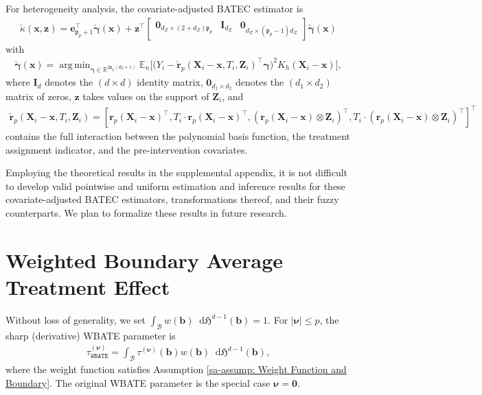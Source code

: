 \documentclass[10pt]{article}
\DeclareMathOperator*{\argmin}{arg\,min}
\newcommand{\En}{\mathbb{E}_n}
\newcommand{\Haus}{\mathfrak{H}}
\newcommand{\dif}{\mathop{}\!\mathrm{d}}
\newcommand{\bb}{\mathbf{b}}
\newcommand{\be}{\mathbf{e}}
\newcommand{\br}{\mathbf{r}}
\newcommand{\bx}{\mathbf{x}}
\newcommand{\bX}{\mathbf{X}}
\newcommand{\bz}{\mathbf{z}}
\newcommand{\bZ}{\mathbf{Z}}
\newcommand{\bnu}{\boldsymbol{\nu}}
\newcommand{\bgamma}{\boldsymbol{\gamma}}
\newcommand{\B}{\mathcal{B}}
\begin{document}
For heterogeneity analysis, the covariate-adjusted BATEC estimator is
\begin{align*}
    \check{\kappa}(\bx,\bz)
    = \be_{\mathfrak{p}_p+1}^{\top}\check{\bgamma}(\bx)
    + \bz^\top
      \begin{bmatrix}
        \mathbf{0}_{d_Z \times (2+d_Z)\mathfrak{p}_p}
        & \mathbf{I}_{d_Z} & \mathbf{0}_{d_Z \times (\mathfrak{p}_p-1)d_Z}
      \end{bmatrix}
      \check{\bgamma}(\bx)
\end{align*}
with
\begin{align*}
    \check{\bgamma}(\bx)
    = \argmin_{\bgamma \in \mathbb{R}^{2\mathfrak{p}_p(d_Z+1)}}
      \En \big[ \big(Y_i - \check{\br}_p(\bX_i-\bx,T_i,\bZ_i)^\top \bgamma \big)^2
                K_h(\bX_i - \bx) \big],
\end{align*}
where $\mathbf{I}_d$ denotes the $(d\times d)$ identity matrix, $\mathbf{0}_{d_1 \times d_2}$ denotes the $(d_1 \times d_2)$ matrix of zeros, $\bz$ takes values on the support of $\bZ_i$, and
\begin{align*}
    \check{\br}_p(\bX_i-\bx,T_i,\bZ_i)
     = [\br_p(\bX_i - \bx)^{\top},T_i\cdot\br_p(\bX_i - \bx)^{\top}, (\br_p(\bX_i - \bx)\otimes \bZ_i)^\top, T_i \cdot (\br_p(\bX_i - \bx)\otimes \bZ_i)^\top]^\top
\end{align*} contains the full interaction between the polynomial basis function, the treatment assignment indicator, and the pre-intervention covariates.

Employing the theoretical results in the supplemental appendix, it is not difficult to develop valid pointwise and uniform estimation and inference results for these covariate-adjusted BATEC estimators, transformations thereof, and their fuzzy counterparts. We plan to formalize these results in future research.


\section{Weighted Boundary Average Treatment Effect}

Without loss of generality, we set $\int_{\B} w(\bb) \dif\Haus^{d-1} (\bb) = 1$. For $|\bnu|\leq p$, the sharp (derivative) WBATE parameter is
\begin{align*}
    \tau_{\mathtt{WBATE}}^{(\bnu)} = \int_{\B} \tau^{(\bnu)}(\bb) w(\bb) \dif\Haus^{d-1}(\bb),
\end{align*}
where the weight function satisfies Assumption \ref{sa-assump: Weight Function and Boundary}. The original WBATE parameter is the special case $\bnu=\mathbf{0}$.
\end{document}
